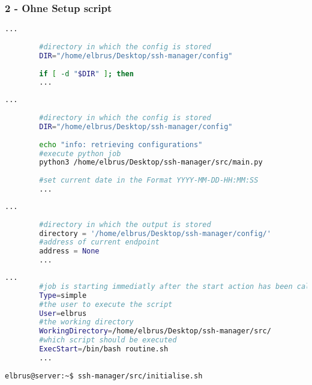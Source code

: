 \documentclass{article}
\begin{document}
	\subsubsection{2 - Ohne Setup script}
	\lstset{style=files}
	\begin{lstlisting}[caption={initialise.sh - Die Variable 'DIR'}, language=bash, keywords={DIR}, keywordstyle=\color{red}, firstnumber=2]
		...
		
		#directory in which the config is stored
		DIR="/home/elbrus/Desktop/ssh-manager/config"
		
		if [ -d "$DIR" ]; then
		...
	\end{lstlisting}

	\begin{lstlisting}[caption={routine.sh - Die Variable 'DIR', Den Pfad zum python Script}, language=bash, keywords={DIR, python3}, keywordstyle=\color{red}, firstnumber=3]
		...
		
		#directory in which the config is stored
		DIR="/home/elbrus/Desktop/ssh-manager/config"
		
		echo "info: retrieving configurations"
		#execute python job
		python3 /home/elbrus/Desktop/ssh-manager/src/main.py
		
		#set current date in the Format YYYY-MM-DD-HH:MM:SS
		...
	\end{lstlisting}

	\begin{lstlisting}[caption={main.py - Die Variable 'directory'}, language=python, keywords={directory}, keywordstyle=\color{red}, firstnumber=11]
		...
		
		#directory in which the output is stored
		directory = '/home/elbrus/Desktop/ssh-manager/config/'
		#address of current endpoint
		address = None
		...
	\end{lstlisting}

	\begin{lstlisting}[caption={ssh-manager.service.example - Die Variable 'WorkingDirectory', Die Variable 'User'},language=bash ,keywords={WorkingDirectory, User}, keywordstyle=\color{red}, firstnumber=5]
		...
		#job is starting immediatly after the start action has been called
		Type=simple
		#the user to execute the script
		User=elbrus
		#the working directory
		WorkingDirectory=/home/elbrus/Desktop/ssh-manager/src/
		#which script should be executed
		ExecStart=/bin/bash routine.sh
		...
	\end{lstlisting}

	\lstset{style=commands}	
	\begin{lstlisting}[caption={Ausführen des Scripts zur Initialisierung des VCS Verzeichnisses.}]
		elbrus@server:~$ ssh-manager/src/initialise.sh
	\end{lstlisting}
\end{document}
